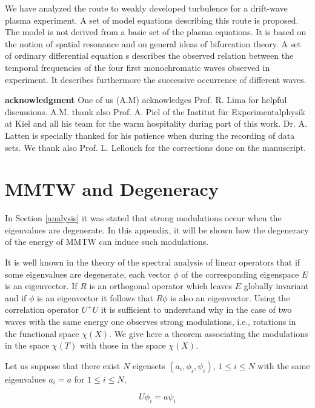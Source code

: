 We have analyzed the route to weakly developed
turbulence for a drift-wave plasma experiment.
A set of model equations  describing this route
is proposed.
The model is not derived from a basic set of the plasma equations.
It is based on the notion of spatial resonance
and on general ideas of bifurcation theory.
A set of ordinary differential equation s
describes the observed relation
between the temporal frequencies of the four first monochromatic waves
observed in experiment.
It describes furthermore the successive occurrence of different waves.

{\bf acknowledgment}
One of us (A.M)  acknowledges Prof. R. Lima for  helpful discussions.
A.M. thank also Prof. A. Piel of the Institut
f\"ur Experimentalphysik at Kiel and all his team for the 
warm hospitality during part of this work.
Dr. A. Latten is specially thanked for his patience when
during the  recording of data sets. We thank also Prof. L. Lellouch
for the corrections done on the manuscript.


\appendix

\section{MMTW and Degeneracy}\label{MMTW}
In Section \ref{analysis} it was stated
that strong modulations occur
when the eigenvalues are degenerate.
In this appendix, it will be shown how the degeneracy
of the energy of MMTW can induce such
modulations.

It is well known in the theory of 
the spectral analysis of linear operators
that if some eigenvalues are degenerate, each vector $\phi$
of the corresponding eigenspace $E$ is an eigenvector. 
If $R$ is an orthogonal operator which leaves $E$ globally
invariant and if $\phi$ is an eigenvector it follows that $R\phi$
is also an eigenvector.
Using the correlation operator $U^+U$ it is
sufficient to understand why in the case of two waves with
the same energy  one observes
strong modulations, i.e.,  rotations in the
functional space $\chi(X)$. We give here a theorem
associating the modulations in the space $\chi(T)$ with
those in the space $\chi(X)$.

Let us suppose that there exist $N$ eigensets $(a_i,\phi_i,\psi_i)$,
 $1\leq i \leq N$
with the same eigenvalues $a_i=a$ for  $1\leq i \leq N$,


\begin{equation}
U\phi_i=a\psi_i
\end{equation}
 
